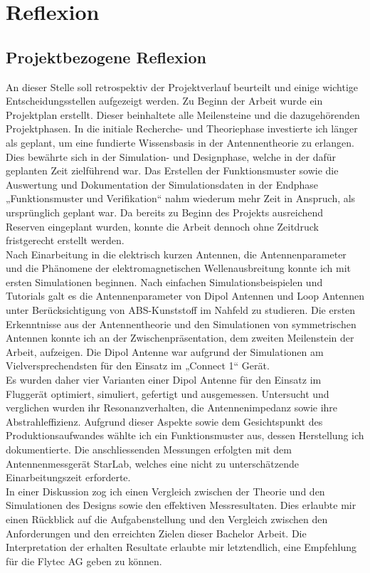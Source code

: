 
\chapter{Reflexion}
\section{Projektbezogene Reflexion}
An dieser Stelle soll retrospektiv der Projektverlauf beurteilt und einige wichtige Entscheidungsstellen aufgezeigt werden. Zu Beginn der Arbeit wurde ein Projektplan erstellt. Dieser beinhaltete alle Meilensteine und die dazugehörenden Projektphasen. In die initiale Recherche- und Theoriephase investierte ich länger als geplant, um eine fundierte Wissensbasis in der Antennentheorie zu erlangen. Dies bewährte sich in der Simulation- und Designphase, welche in der dafür geplanten Zeit zielführend war. Das Erstellen der Funktionsmuster sowie die Auswertung und Dokumentation der Simulationsdaten in der Endphase „Funktionsmuster und Verifikation“ nahm wiederum mehr Zeit in Anspruch, als ursprünglich geplant war. Da bereits zu Beginn des Projekts ausreichend Reserven eingeplant wurden, konnte die Arbeit dennoch ohne Zeitdruck fristgerecht erstellt werden.\\
Nach Einarbeitung in die elektrisch kurzen Antennen, die Antennenparameter und die Phänomene der elektromagnetischen Wellenausbreitung konnte ich mit ersten Simulationen beginnen. Nach einfachen Simulationsbeispielen und Tutorials galt es die Antennenparameter von Dipol Antennen und Loop Antennen unter Berücksichtigung von ABS-Kunststoff im Nahfeld zu studieren. Die ersten Erkenntnisse aus der Antennentheorie und den Simulationen von symmetrischen Antennen konnte ich an der Zwischenpräsentation, dem zweiten Meilenstein der Arbeit, aufzeigen. Die Dipol Antenne war aufgrund der Simulationen am Vielversprechendsten für den Einsatz im „Connect 1“ Gerät.\\
Es wurden daher vier Varianten einer Dipol Antenne für den Einsatz im Fluggerät optimiert, simuliert, gefertigt und ausgemessen. Untersucht und verglichen wurden ihr Resonanzverhalten, die Antennenimpedanz sowie ihre Abstrahleffizienz. Aufgrund dieser Aspekte sowie dem Gesichtspunkt des Produktionsaufwandes wählte ich ein Funktionsmuster aus, dessen  Herstellung ich dokumentierte. Die anschliessenden Messungen erfolgten mit dem Antennenmessgerät StarLab, welches eine nicht zu unterschätzende Einarbeitungszeit erforderte. \\
In einer Diskussion zog ich einen Vergleich zwischen der Theorie und den Simulationen des Designs sowie den effektiven Messresultaten. Dies erlaubte mir einen Rückblick auf die Aufgabenstellung und den Vergleich zwischen den Anforderungen und den erreichten Zielen dieser Bachelor Arbeit. Die Interpretation der erhalten Resultate erlaubte mir letztendlich, eine Empfehlung für die Flytec AG geben zu können.  

